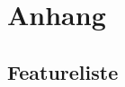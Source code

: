 \documentclass[12pt,a4paper]{scrartcl}
\begin{document}
\section{Anhang}

\subsection{Featureliste}
\label{featureliste}



\pagebreak



\pagebreak
\listoffigures

\end{document}
